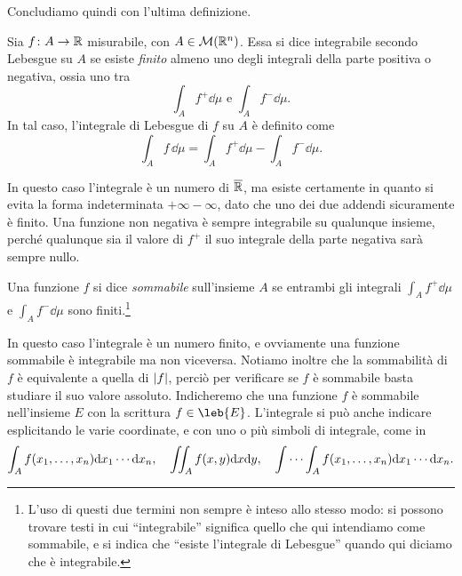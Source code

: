 Concludiamo quindi con l'ultima definizione.
\begin{definizione} \label{d:integrale-lebesgue-funzioni-qualunque}
	Sia $f\colon A\to\mathbb{R}$ misurabile, con $A\in\mathcal M(\mathbb{R}^n)$.
	Essa si dice integrabile secondo Lebesgue su $A$ se esiste \emph{finito} almeno uno degli integrali della parte positiva o negativa, ossia uno tra
	\begin{equation*}
		\int_Af^+\dd\mu\text{ e }\int_Af^-\dd\mu.
	\end{equation*}
	In tal caso, l'integrale di Lebesgue di $f$ su $A$ è definito come
	\begin{equation}
		\int_Af\,\dd\mu=\int_Af^+\dd\mu-\int_Af^-\dd\mu.
		\label{eq:integrale-lebesgue-funzioni-qualunque}
	\end{equation}
\end{definizione}
In questo caso l'integrale è un numero di $\overline{\mathbb{R}}$, ma esiste certamente in quanto si evita la forma indeterminata $+\infty-\infty$, dato che uno dei due addendi sicuramente è finito.
Una funzione non negativa è sempre integrabile su qualunque insieme, perch\'e qualunque sia il valore di $f^+$ il suo integrale della parte negativa sarà sempre nullo.
\begin{definizione} \label{d:funzione-sommabile}
	Una funzione $f$ si dice \emph{sommabile} sull'insieme $A$ se entrambi gli integrali $\int_Af^+\dd\mu$ e $\int_Af^-\dd\mu$ sono finiti.\footnote{L'uso di questi due termini non sempre è inteso allo stesso modo: si possono trovare testi in cui ``integrabile'' significa quello che qui intendiamo come sommabile, e si indica che ``esiste l'integrale di Lebesgue'' quando qui diciamo che è integrabile.}
\end{definizione}
In questo caso l'integrale è un numero finito, e ovviamente una funzione sommabile è integrabile ma non viceversa.
Notiamo inoltre che la sommabilità di $f$ è equivalente a quella di $\lvert f\rvert$, perciò per verificare se $f$ è sommabile basta studiare il suo valore assoluto.
Indicheremo che una funzione $f$ è sommabile nell'insieme $E$ con la scrittura $f\in\leb{E}$.
L'integrale si può anche indicare esplicitando le varie coordinate, e con uno o più simboli di integrale, come in
\begin{equation*}
	\int_Af(x_1,\dots,x_n)\textup{d} x_1\cdots\textup{d} x_n,\quad \iint_Af(x,y)\textup{d} x\textup{d} y,\quad \idotsint_Af(x_1,\dots,x_n)\textup{d} x_1\cdots\textup{d} x_n.
\end{equation*}

